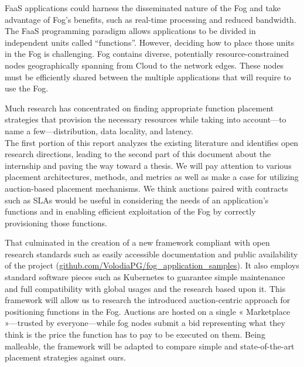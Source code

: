 \Gls{FaaS} applications could harness the disseminated nature of the Fog and take advantage of Fog’s benefits, such as real-time processing and reduced bandwidth. The \gls{FaaS} programming paradigm allows applications to be divided in independent units called “functions”. However, deciding how to place those units in the Fog is challenging. Fog contains diverse, potentially resource-constrained nodes geographically spanning from Cloud to the network edges. These nodes must be efficiently shared between the multiple applications that will require to use the Fog.

Much research has concentrated on finding appropriate function placement strategies that provision the necessary resources while taking into account—to name a few—distribution, data locality, and latency. \\
The first portion of this report analyzes the existing literature and identifies open research directions, leading to the second part of this document about the internship and paving the way toward a thesis. We will pay attention to various placement architectures, methods, and metrics as well as make a case for utilizing auction-based placement mechanisms.
We think auctions paired with contracts such as \glspl{SLA} would be useful in considering the needs of an application’s functions and in enabling efficient exploitation of the Fog by correctly provisioning those functions.

That culminated in the creation of a new framework compliant with open research standards such as easily accessible documentation and public availability of the project (\href{https://github.com/VolodiaPG/fog_application_samples}{github.com/VolodiaPG/fog\_application\_samples}). It also employs standard software pieces such as Kubernetes to guarantee simple maintenance and full compatibility with global usages and the research based upon it. This framework will allow us to research the introduced auction-centric approach for positioning functions in the Fog. Auctions are hosted on a single « Marketplace »—trusted by everyone—while fog nodes submit a bid representing what they think is the price the function has to pay to be executed on them. Being malleable, the framework will be adapted to compare simple and state-of-the-art placement strategies against ours.

